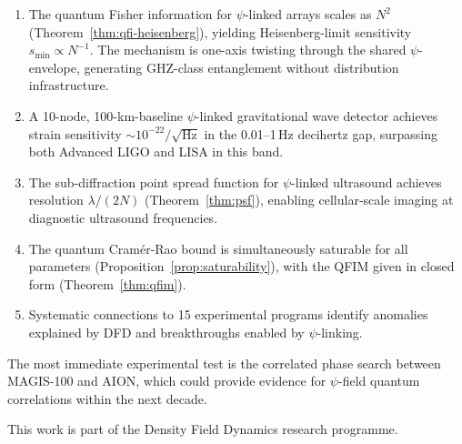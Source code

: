 \documentclass[aps,prl,twocolumn,superscriptaddress,showpacs]{revtex4-2}
\theoremstyle{definition}
\begin{document}
\begin{enumerate}
\item The quantum Fisher information for $\psi$-linked arrays scales
as $N^2$ (Theorem~\ref{thm:qfi-heisenberg}), yielding Heisenberg-limit
sensitivity $s_{\min} \propto N^{-1}$. The mechanism is one-axis
twisting through the shared $\psi$-envelope, generating GHZ-class
entanglement without distribution infrastructure.

\item A 10-node, 100-km-baseline $\psi$-linked gravitational wave
detector achieves strain sensitivity
$\sim 10^{-22}/\sqrt{\mathrm{Hz}}$ in the 0.01--1\,Hz decihertz
gap, surpassing both Advanced LIGO and LISA in this band.

\item The sub-diffraction point spread function for $\psi$-linked
ultrasound achieves resolution $\lambda/(2N)$
(Theorem~\ref{thm:psf}), enabling cellular-scale imaging at
diagnostic ultrasound frequencies.

\item The quantum Cram\'er-Rao bound is simultaneously saturable
for all parameters (Proposition~\ref{prop:saturability}), with the
QFIM given in closed form (Theorem~\ref{thm:qfim}).

\item Systematic connections to 15 experimental programs identify
anomalies explained by DFD and breakthroughs enabled by $\psi$-linking.
\end{enumerate}

The most immediate experimental test is the correlated phase search
between MAGIS-100 and AION, which could provide evidence for
$\psi$-field quantum correlations within the next decade.

\begin{acknowledgments}
This work is part of the Density Field Dynamics research programme.
\end{acknowledgments}
\end{document}
